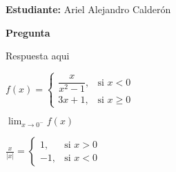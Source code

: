 \documentclass[answers]{exam} %
\begin{document}

\vspace{0.5cm}
\large\textbf{Estudiante:} Ariel Alejandro Calderón
\vspace{0.5cm}


\begin{questions}

    \question \large\textbf{Pregunta}
    \begin{solution}
        Respuesta aqui
    \end{solution}

    \vspace{0.5cm}

    \(f(x) =
    \begin{cases}
        \dfrac{x}{x^2 -1}, & \text{si } x < 0   \\
        3x + 1,            & \text{si } x \ge 0
    \end{cases}\)

    \(\lim_{x \to 0^-} f(x)  \)

    \(
    \frac{x}{|x|} =
    \begin{cases}
        1,  & \text{si } x > 0 \\
        -1, & \text{si } x < 0
    \end{cases}
    \)

\end{questions}
\end{document}
